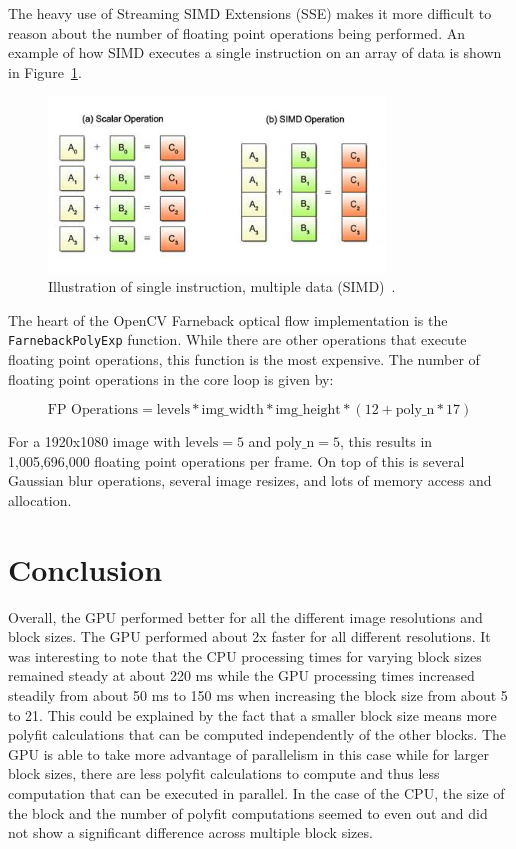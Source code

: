 \documentclass[12pt,letterpaper]{article}
\begin{document}
The heavy use of Streaming SIMD Extensions (SSE) makes it more difficult to
reason about the number of floating point operations being performed. An example
of how SIMD executes a single instruction on an array of data is shown in
Figure~\ref{fig:simd}.

\begin{figure}[h]
  \centering
    \includegraphics[width=0.8\textwidth]{img/simd.jpg}
  \caption{Illustration of single instruction, multiple data (SIMD)~\cite{simd}.}
  \label{fig:simd}
\end{figure}

The heart of the OpenCV Farneback optical flow implementation is the
\texttt{FarnebackPolyExp} function. While there are other operations that
execute floating point operations, this function is the most expensive. The
number of floating point operations in the core loop is given by:

$$
\text{FP Operations} = \text{levels} * \text{img\_width} * \text{img\_height}
                * (12 + \text{poly\_n} * 17)
$$

For a 1920x1080 image with $\text{levels}=5$ and $\text{poly\_n}=5$, this results in
1,005,696,000 floating point operations per frame. On top of this is several
Gaussian blur operations, several image resizes, and lots of memory access and
allocation.

\section{Conclusion}
Overall, the GPU performed better for all the different image resolutions and
block sizes. The GPU performed about 2x faster for all different resolutions.
It was interesting to note that the CPU processing times for varying block 
sizes remained steady at about 220 ms while the GPU processing times 
increased steadily from about 50 ms to 150 ms when increasing the block size
from about 5 to 21. This could be explained by the fact that a smaller block 
size means more polyfit calculations that can be computed independently
of the other blocks. The GPU is able to take more advantage of parallelism in
this case while for larger block sizes, there are less polyfit calculations to 
compute and thus less computation that can be executed in parallel. In the case
of the CPU, the size of the block and the number of polyfit computations 
seemed to even out and did not show a significant difference across multiple 
block sizes. 
\end{document}
